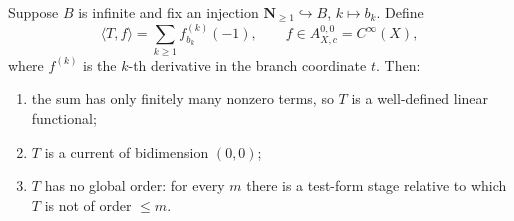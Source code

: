 \begin{example}
\label{ex:ch14-star-unbounded-order}
Suppose $B$ is infinite and fix an injection
$\mathbf N_{\ge1}\hookrightarrow B$, $k\mapsto b_k$.  Define
\[
 \langle T,f\rangle=\sum_{k\ge1}f_{b_k}^{(k)}(-1),
 \qquad f\in A_{X,c}^{0,0}=C^\infty(X),
\]
where $f^{(k)}$ is the $k$-th derivative in the branch coordinate $t$.  Then:
\begin{enumerate}
\item the sum has only finitely many nonzero terms, so $T$ is a well-defined
  linear functional;
\item $T$ is a current of bidimension $(0,0)$;
\item $T$ has no global order: for every $m$ there is a test-form stage
  relative to which $T$ is not of order $\le m$.
\end{enumerate}
\end{example}


